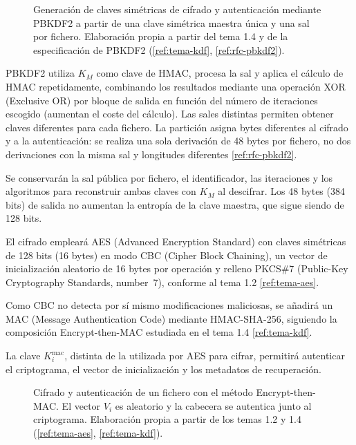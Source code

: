 \begin{figure}[H]
  \centering
  \resizebox{\linewidth}{!}{}
  \caption{Generación de claves simétricas de cifrado y autenticación mediante PBKDF2 a partir de una clave simétrica maestra única y una sal por fichero. Elaboración propia a partir del tema 1.4 y de la especificación de PBKDF2 (\ref{ref:tema-kdf}, \ref{ref:rfc-pbkdf2}).}
  \label{fig:p1-derivacion}
\end{figure}

PBKDF2 utiliza $K_M$ como clave de HMAC, procesa la sal y aplica el cálculo de HMAC repetidamente, combinando los resultados mediante una operación XOR (Exclusive OR) por bloque de salida en función del número de iteraciones escogido (aumentan el coste del cálculo).
Las sales distintas permiten obtener claves diferentes para cada fichero. La partición asigna bytes diferentes al cifrado y a la autenticación: se realiza una sola derivación de 48 bytes por fichero, no dos derivaciones con la misma sal y longitudes diferentes \ref{ref:rfc-pbkdf2}.

Se conservarán la sal pública por fichero, el identificador, las iteraciones y los algoritmos para reconstruir ambas claves con $K_M$ al descifrar. Los 48 bytes (384 bits) de salida no aumentan la entropía de la clave maestra, que sigue siendo de 128 bits.

El cifrado empleará AES (Advanced Encryption Standard) con claves simétricas de 128 bits (16 bytes) en modo CBC (Cipher Block Chaining), un vector de inicialización aleatorio de 16 bytes por operación y relleno PKCS\#7 (Public-Key Cryptography Standards, number~7), conforme al tema 1.2 \ref{ref:tema-aes}.

Como CBC no detecta por sí mismo modificaciones maliciosas, se añadirá un MAC (Message Authentication Code) mediante HMAC-SHA-256, siguiendo la composición Encrypt-then-MAC estudiada en el tema 1.4 \ref{ref:tema-kdf}.

La clave $K_i^{\mathrm{mac}}$, distinta de la utilizada por AES para cifrar, permitirá autenticar el criptograma, el vector de inicialización y los metadatos de recuperación.

\begin{figure}[H]
  \centering
  \resizebox{\linewidth}{!}{}
  \caption{Cifrado y autenticación de un fichero con el método Encrypt-then-MAC. El vector $V_i$ es aleatorio y la cabecera se autentica junto al criptograma. Elaboración propia a partir de los temas 1.2 y 1.4 (\ref{ref:tema-aes}, \ref{ref:tema-kdf}).}
  \label{fig:p1-cifrado}
\end{figure}

